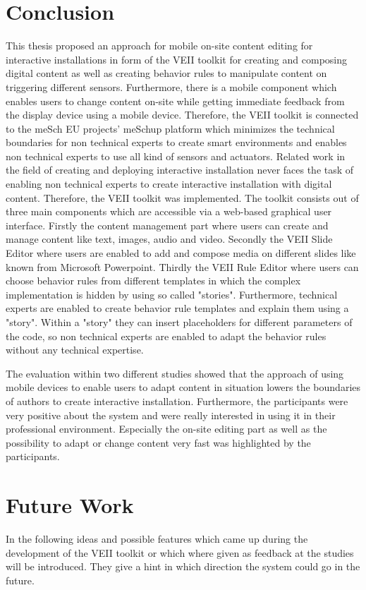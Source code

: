 \section*{Conclusion}
This thesis proposed an approach for mobile on-site content editing for interactive installations in form of the VEII toolkit for creating and composing digital content as well as creating behavior rules to manipulate content on triggering different sensors. Furthermore, there is a mobile component which enables users to change content on-site while getting immediate feedback from the display device using a mobile device. Therefore, the VEII toolkit is connected to the meSch EU projects' meSchup platform which minimizes the technical boundaries for non technical experts to create smart environments and enables non technical experts to use all kind of sensors and actuators. 
Related work in the field of creating and deploying interactive installation never faces the task of enabling non technical experts to create interactive installation with digital content. Therefore, the VEII toolkit was implemented.
The toolkit consists out of three main components which are accessible via a web-based graphical user interface. Firstly the content management part where users can create and manage content like text, images, audio and video. Secondly the VEII Slide Editor where users are enabled to add and compose media on different slides like known from Microsoft Powerpoint. Thirdly the VEII Rule Editor where users can choose behavior rules from different templates in which the complex implementation is hidden by using so called "stories". Furthermore, technical experts are enabled to create behavior rule templates and explain them using a "story". Within a "story" they can insert placeholders for different parameters of the code, so non technical experts are enabled to adapt the behavior rules without any technical expertise. 

The evaluation within two different studies showed that the approach of using mobile devices to enable users to adapt content in situation lowers the boundaries of authors to create interactive installation. Furthermore, the participants were very positive about the system and were really interested in using it in their professional environment. Especially the on-site editing part as well as the possibility to adapt or change content very fast was highlighted by the participants.

\section*{Future Work}
In the following ideas and possible features which came up during the development of the VEII toolkit or which where given as feedback at the studies will be introduced. They give a hint in which direction the system could go in the future.
\newline

